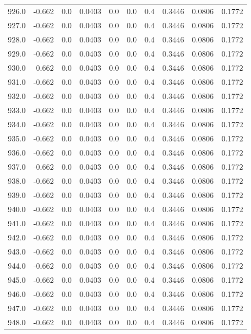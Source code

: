 \begin{longtable}{lrrrrrrrrr}
926.0 & -0.662 & 0.0 & 0.0403 & 0.0 & 0.0 & 0.4 & 0.3446 & 0.0806 & 0.1772 \\
927.0 & -0.662 & 0.0 & 0.0403 & 0.0 & 0.0 & 0.4 & 0.3446 & 0.0806 & 0.1772 \\
928.0 & -0.662 & 0.0 & 0.0403 & 0.0 & 0.0 & 0.4 & 0.3446 & 0.0806 & 0.1772 \\
929.0 & -0.662 & 0.0 & 0.0403 & 0.0 & 0.0 & 0.4 & 0.3446 & 0.0806 & 0.1772 \\
930.0 & -0.662 & 0.0 & 0.0403 & 0.0 & 0.0 & 0.4 & 0.3446 & 0.0806 & 0.1772 \\
931.0 & -0.662 & 0.0 & 0.0403 & 0.0 & 0.0 & 0.4 & 0.3446 & 0.0806 & 0.1772 \\
932.0 & -0.662 & 0.0 & 0.0403 & 0.0 & 0.0 & 0.4 & 0.3446 & 0.0806 & 0.1772 \\
933.0 & -0.662 & 0.0 & 0.0403 & 0.0 & 0.0 & 0.4 & 0.3446 & 0.0806 & 0.1772 \\
934.0 & -0.662 & 0.0 & 0.0403 & 0.0 & 0.0 & 0.4 & 0.3446 & 0.0806 & 0.1772 \\
935.0 & -0.662 & 0.0 & 0.0403 & 0.0 & 0.0 & 0.4 & 0.3446 & 0.0806 & 0.1772 \\
936.0 & -0.662 & 0.0 & 0.0403 & 0.0 & 0.0 & 0.4 & 0.3446 & 0.0806 & 0.1772 \\
937.0 & -0.662 & 0.0 & 0.0403 & 0.0 & 0.0 & 0.4 & 0.3446 & 0.0806 & 0.1772 \\
938.0 & -0.662 & 0.0 & 0.0403 & 0.0 & 0.0 & 0.4 & 0.3446 & 0.0806 & 0.1772 \\
939.0 & -0.662 & 0.0 & 0.0403 & 0.0 & 0.0 & 0.4 & 0.3446 & 0.0806 & 0.1772 \\
940.0 & -0.662 & 0.0 & 0.0403 & 0.0 & 0.0 & 0.4 & 0.3446 & 0.0806 & 0.1772 \\
941.0 & -0.662 & 0.0 & 0.0403 & 0.0 & 0.0 & 0.4 & 0.3446 & 0.0806 & 0.1772 \\
942.0 & -0.662 & 0.0 & 0.0403 & 0.0 & 0.0 & 0.4 & 0.3446 & 0.0806 & 0.1772 \\
943.0 & -0.662 & 0.0 & 0.0403 & 0.0 & 0.0 & 0.4 & 0.3446 & 0.0806 & 0.1772 \\
944.0 & -0.662 & 0.0 & 0.0403 & 0.0 & 0.0 & 0.4 & 0.3446 & 0.0806 & 0.1772 \\
945.0 & -0.662 & 0.0 & 0.0403 & 0.0 & 0.0 & 0.4 & 0.3446 & 0.0806 & 0.1772 \\
946.0 & -0.662 & 0.0 & 0.0403 & 0.0 & 0.0 & 0.4 & 0.3446 & 0.0806 & 0.1772 \\
947.0 & -0.662 & 0.0 & 0.0403 & 0.0 & 0.0 & 0.4 & 0.3446 & 0.0806 & 0.1772 \\
948.0 & -0.662 & 0.0 & 0.0403 & 0.0 & 0.0 & 0.4 & 0.3446 & 0.0806 & 0.1772 \\

\end{longtable}
